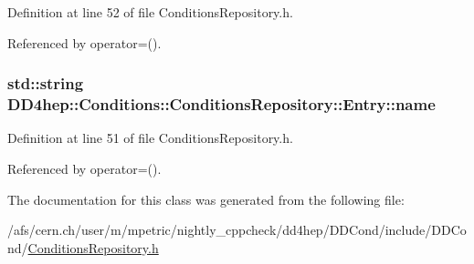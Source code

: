 Definition at line 52 of file ConditionsRepository.h.

Referenced by operator=().\hypertarget{class_d_d4hep_1_1_conditions_1_1_conditions_repository_1_1_entry_a72388605da0e0b2ec2bafa344776f967}{
\subsubsection[{name}]{\setlength{\rightskip}{0pt plus 5cm}std::string {\bf DD4hep::Conditions::ConditionsRepository::Entry::name}}}
\label{class_d_d4hep_1_1_conditions_1_1_conditions_repository_1_1_entry_a72388605da0e0b2ec2bafa344776f967}


Definition at line 51 of file ConditionsRepository.h.

Referenced by operator=().

The documentation for this class was generated from the following file:\begin{DoxyCompactItemize}
\item 
/afs/cern.ch/user/m/mpetric/nightly\_\-cppcheck/dd4hep/DDCond/include/DDCond/\hyperlink{_conditions_repository_8h}{ConditionsRepository.h}\end{DoxyCompactItemize}
